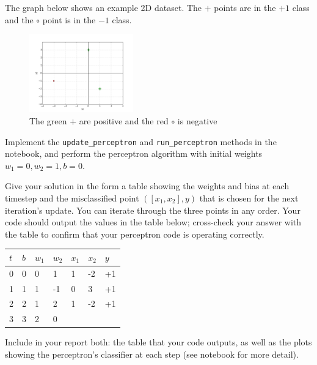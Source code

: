 \begin{problem}[8]
  The graph below shows an example 2D dataset. The $+$ points are in the $+1$ class and the $\circ$ point is in the $-1$ class. 

  \begin{figure}[H]
    \centering
    \includegraphics[width=0.4\textwidth]{images/perceptron.png}
    \caption{The green $+$ are positive and the red $\circ$ is negative}
    \label{fig:figure1}
  \end{figure}
  
 Implement the \texttt{update_perceptron} and \texttt{run_perceptron} methods in the notebook, and perform the perceptron algorithm with initial weights $w_1 = 0, w_2 = 1, b = 0$.

  Give your solution in the form a table showing the weights and bias at each timestep and the misclassified point $([x_1,x_2],y)$ that is chosen for the next iteration's update. You can iterate through the three points in any order. Your code should output the values in the table below; cross-check your answer with the table to confirm that your perceptron code is operating correctly.

  \begin{table}[H]
    \centering

    \begin{tabular}{l|lll|ll|l}
    \hline

    \hline
    $t$ & $b$ & $w_1$ & $w_2$ & $x_1$ & $x_2$ & $y$ \\
    \hline
      0  &  0 & 0 & 1  & 1 & -2 & +1\\
      1  &  1 & 1 & -1 & 0 & 3 & +1\\
      2  &  2 & 1 & 2 & 1 & -2 & +1\\
      3  &  3 & 2 & 0 \\
    \hline
    \end{tabular}
  \end{table}
  
  Include in your report both: the table that your code outputs, as well as the plots showing the perceptron's classifier at each step (see notebook for more detail).
  
  
\end{problem}
\begin{solution}


\end{solution}

